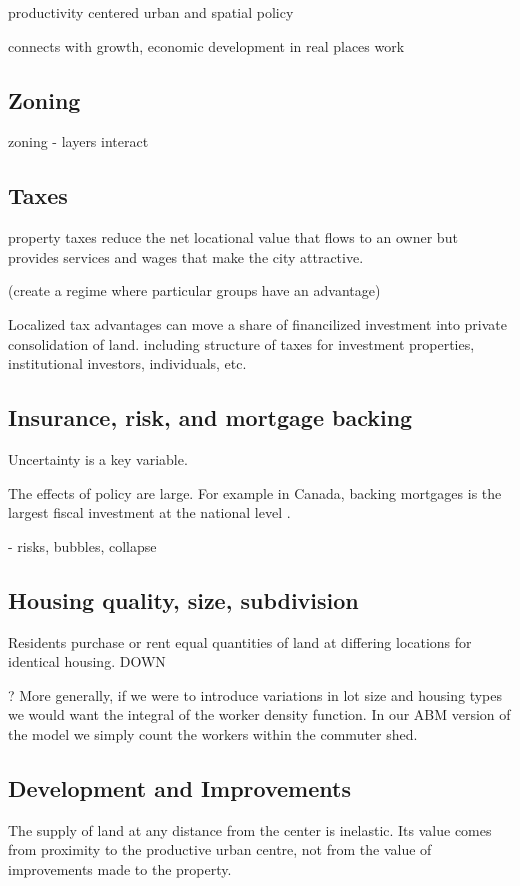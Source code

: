 productivity centered urban and spatial policy

connects with growth, economic development in real places work

\subsection{Zoning}
zoning - layers interact

\subsection{Taxes}
property taxes reduce the net locational value that flows to an owner but provides services and wages that make the city attractive. 

(create a regime where particular groups have an advantage)

Localized tax advantages can move a share of financilized investment into private consolidation of land.
including structure of taxes for investment properties, institutional investors, individuals, etc.


\subsection{Insurance, risk, and mortgage backing}

Uncertainty is a key variable.

The effects of policy are large. For example in Canada, backing mortgages is the largest fiscal investment at the national level \cite{nemtinFinancializationHousingSocial2021}.

- risks, bubbles, collapse


\subsection{Housing quality, size, subdivision}
Residents  purchase or rent equal quantities of land at differing locations %
for identical housing.  DOWN

? More generally, if we were to introduce variations in lot size and housing types  we would want the integral of the worker density function. In our ABM version  of the model we simply count the workers within the commuter shed.

\subsection{Development and Improvements}
The supply of land at any distance from the center is inelastic. 
Its value comes from proximity to the productive urban centre, not from the value of improvements made to the property.

